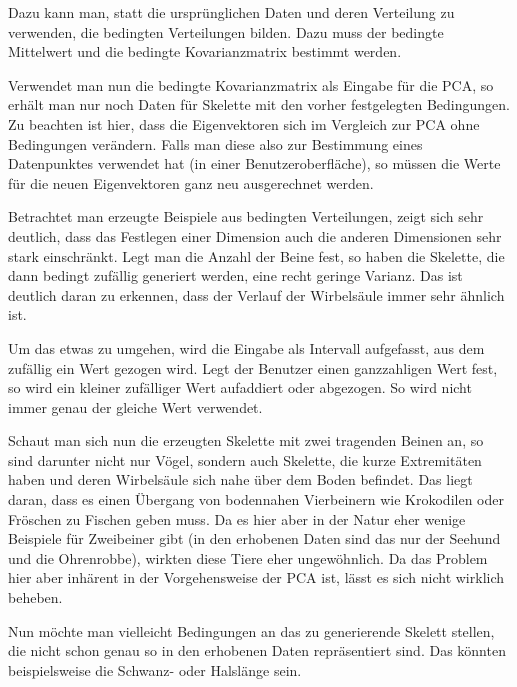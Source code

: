  Dazu kann man, statt die ursprünglichen Daten und deren Verteilung zu verwenden, die bedingten Verteilungen bilden. Dazu muss der bedingte Mittelwert und die bedingte Kovarianzmatrix bestimmt werden.
 
 Verwendet man nun die bedingte Kovarianzmatrix als Eingabe für die PCA, so erhält man nur noch Daten für Skelette mit den vorher festgelegten Bedingungen. Zu beachten ist hier, dass die Eigenvektoren sich im Vergleich zur PCA ohne Bedingungen verändern. Falls man diese also zur Bestimmung eines Datenpunktes verwendet hat (\zb in einer Benutzeroberfläche), so müssen die Werte für die neuen Eigenvektoren ganz neu ausgerechnet werden. 
 
 Betrachtet man erzeugte Beispiele aus bedingten Verteilungen, zeigt sich sehr deutlich, dass das Festlegen einer Dimension auch die anderen Dimensionen sehr stark einschränkt. Legt man \zb die Anzahl der Beine fest, so haben die Skelette, die dann bedingt zufällig generiert werden, eine recht geringe Varianz. Das ist deutlich daran zu erkennen, dass der Verlauf der Wirbelsäule immer sehr ähnlich ist.

 Um das etwas zu umgehen, wird die Eingabe als Intervall aufgefasst, aus dem zufällig ein Wert gezogen wird. Legt \zb der Benutzer einen ganzzahligen Wert fest, so wird ein kleiner zufälliger Wert aufaddiert oder abgezogen.  So wird nicht immer genau der gleiche Wert verwendet.
 
 Schaut man sich nun die erzeugten Skelette mit zwei tragenden Beinen an, so sind darunter nicht nur Vögel, sondern auch Skelette, die kurze Extremitäten haben und deren Wirbelsäule sich nahe über dem Boden befindet. 
 Das liegt daran, dass es einen Übergang von bodennahen Vierbeinern wie Krokodilen oder Fröschen zu Fischen geben muss. Da es hier aber in der Natur eher wenige Beispiele für Zweibeiner gibt (in den erhobenen Daten sind das nur der Seehund und die Ohrenrobbe), wirkten diese Tiere eher ungewöhnlich.
 Da das Problem hier aber inhärent in der Vorgehensweise der PCA ist, lässt es sich nicht wirklich beheben.
 
 Nun möchte man vielleicht Bedingungen an das zu generierende Skelett stellen, die nicht schon genau so in den erhobenen Daten repräsentiert sind. Das könnten beispielsweise die Schwanz- oder Halslänge sein.
 
